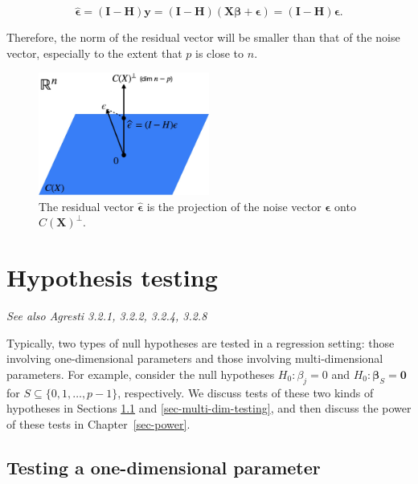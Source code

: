 \documentclass[
  11pt,
  letterpaper,
  oneside]{book}
\theoremstyle{definition}
\theoremstyle{plain}
\theoremstyle{plain}
\theoremstyle{plain}
\theoremstyle{remark}
\begin{document}
\[
\boldsymbol{\widehat{\epsilon}} = (\boldsymbol{I} - \boldsymbol{H})\boldsymbol{y} = (\boldsymbol{I} - \boldsymbol{H})(\boldsymbol{X} \boldsymbol{\beta} + \boldsymbol{\epsilon}) = (\boldsymbol{I} - \boldsymbol{H})\boldsymbol{\epsilon}.
\]

Therefore, the norm of the residual vector will be smaller than that of
the noise vector, especially to the extent that \(p\) is close to \(n\).

\begin{figure}

{\centering \includegraphics[width=0.5\textwidth,height=\textheight]{figures/residuals-as-noise-projection.jpg}

}

\caption{\label{fig-residuals-as-noise-projection}The residual vector
\(\boldsymbol{\widehat{\epsilon}}\) is the projection of the noise
vector \(\boldsymbol{\epsilon}\) onto \(C(\boldsymbol{X})^\perp\).}

\end{figure}

\hypertarget{hypothesis-testing}{%
\chapter{Hypothesis testing}\label{hypothesis-testing}}

\emph{See also Agresti 3.2.1, 3.2.2, 3.2.4, 3.2.8}

Typically, two types of null hypotheses are tested in a regression
setting: those involving one-dimensional parameters and those involving
multi-dimensional parameters. For example, consider the null hypotheses
\(H_0: \beta_j = 0\) and \(H_0: \boldsymbol{\beta}_S = \boldsymbol{0}\)
for \(S \subseteq \{0, 1, \dots, p-1\}\), respectively. We discuss tests
of these two kinds of hypotheses in Sections \ref{sec-one-dim-testing}
and \ref{sec-multi-dim-testing}, and then discuss the power of these
tests in Chapter~\ref{sec-power}.

\hypertarget{sec-one-dim-testing}{%
\section{Testing a one-dimensional
parameter}\label{sec-one-dim-testing}}
\end{document}
